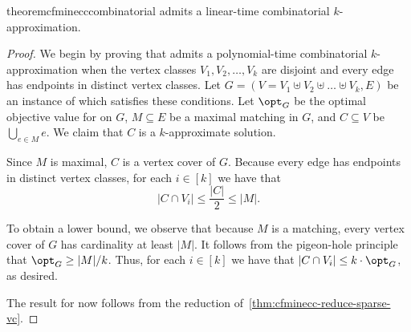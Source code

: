 \begin{restatable}{theorem}{cfminecccombinatorial}\label{thm-combinatorial-k-approx}
    \cfminECC{} admits a linear-time combinatorial $k$-approximation.
\end{restatable}
\begin{proof}
    We begin by proving that \SVC{} admits a polynomial-time combinatorial $k$-approximation when the vertex classes $V_1, V_2, \ldots, V_k$ are disjoint and every edge has endpoints in distinct vertex classes.
    Let $G = (V = V_1 \uplus V_2 \uplus \ldots \uplus V_k, E)$ be an instance of \SVC{} which satisfies these conditions.
    Let $\opt_G$ be the optimal objective value for \SVC{} on $G$, $M \subseteq E$ be a maximal matching in $G$, and $C \subseteq V$ be $\bigcup_{e \in M} e$.
    We claim that $C$ is a $k$-approximate solution.

    Since $M$ is maximal, $C$ is a vertex cover of $G$. Because every edge has endpoints in distinct vertex classes,
    for each $i \in [k]$ we have that
    \[
        |C \cap V_i| \leq \frac{|C|}{2} \leq |M|.
    \]

    To obtain a lower bound, we observe that because $M$ is a matching, every vertex cover of $G$ has cardinality at least $|M|$.
    It follows from the pigeon-hole principle that $\opt_G \geq |M|/k$. Thus,
    for each $i \in [k]$ we have that $|C \cap V_i| \leq k\cdot\opt_G$, as desired.

    The result for \cfminECC{} now follows from the reduction of~\cref{thm:cfminecc-reduce-sparse-vc}.
\end{proof}